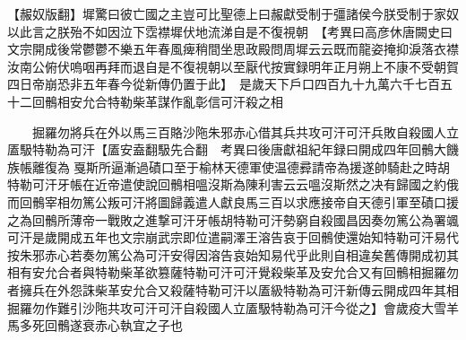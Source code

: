 【赧奴版翻】墀驚曰彼亡國之主豈可比聖德上曰赧獻受制于彊諸侯今朕受制于家奴以此言之朕殆不如因泣下霑襟墀伏地流涕自是不復視朝　【考異曰高彦休唐闕史曰文宗開成後常鬱鬱不樂五年春風痺稍間坐思政殿問周墀云云既而龍姿掩抑淚落衣襟汝南公俯伏嗚咽再拜而退自是不復視朝以至厭代按實録明年正月朔上不康不受朝賀四日帝崩恐非五年春今從新傳仍置于此】　是歲天下戶口四百九十九萬六千七百五十二回鶻相安允合特勒柴革謀作亂彰信可汗殺之相

　　掘羅勿將兵在外以馬三百賂沙陁朱邪赤心借其兵共攻可汗可汗兵敗自殺國人立㕎馺特勒為可汗【㕎安盍翻馺先合翻　考異曰後唐獻祖紀年録曰開成四年回鶻大饑族帳離復為戛斯所逼漸過磧口至于榆林天德軍使温德彛請帝為援遂帥騎赴之時胡特勒可汗牙帳在近帝遣使說回鶻相嗢沒斯為陳利害云云嗢沒斯然之决有歸國之約俄而回鶻宰相勿篤公叛可汗將圖歸義遣人獻良馬三百以求應接帝自天德引軍至磧口援之為回鶻所薄帝一戰敗之進撃可汗牙帳胡特勒可汗勢窮自殺國昌因奏勿篤公為署颯可汗是歲開成五年也文宗崩武宗即位遣嗣澤王溶告哀于回鶻使還始知特勒可汗易代按朱邪赤心若奏勿篤公為可汗安得因溶告哀始知易代乎此則自相違矣舊傳開成初其相有安允合者與特勒柴革欲篡薩特勒可汗可汗覺殺柴革及安允合又有回鶻相掘羅勿者擁兵在外怨誅柴革安允合又殺薩特勒可汗以㕎級特勒為可汗新傳云開成四年其相掘羅勿作難引沙陁共攻可汗可汗自殺國人立㕎馺特勒為可汗今從之】會歲疫大雪羊馬多死回鶻遂衰赤心執宜之子也

